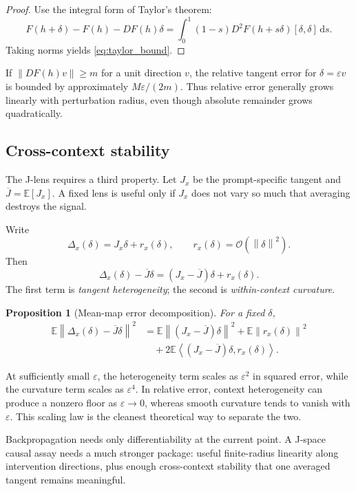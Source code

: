 \documentclass[11pt]{article}
\newcommand{\E}{\mathbb{E}}
\newcommand{\Jbar}{\overline{J}}
\newcommand{\Norm}[1]{\left\lVert #1 \right\rVert}
\newcommand{\ip}[2]{\left\langle #1,#2 \right\rangle}
\newcommand{\dd}{\,\mathrm{d}}
\newcommand{\cO}{\mathcal{O}}
\newcommand{\eps}{\varepsilon}
\newtheorem{proposition}{Proposition}
\theoremstyle{definition}
\theoremstyle{remark}
\begin{document}
\begin{proof}
Use the integral form of Taylor's theorem:
\[
F(h+\delta)-F(h)-DF(h)\delta
=\int_0^1(1-s)D^2F(h+s\delta)[\delta,\delta]\dd s.
\]
Taking norms yields \cref{eq:taylor_bound}.
\end{proof}

If $\Norm{DF(h)v}\ge m$ for a unit direction $v$, the relative tangent error for $\delta=\eps v$ is bounded by approximately $M\eps/(2m)$. Thus relative error generally grows linearly with perturbation radius, even though absolute remainder grows quadratically.

\subsection{Cross-context stability}
The J-lens requires a third property. Let $J_x$ be the prompt-specific tangent and $\Jbar=\E[J_x]$. A fixed lens is useful only if $J_x$ does not vary so much that averaging destroys the signal.

Write
\begin{equation}
  \Delta_x(\delta)=J_x\delta+r_x(\delta),
  \qquad r_x(\delta)=\cO(\Norm{\delta}^2).
  \label{eq:context_decomp}
\end{equation}
Then
\begin{equation}
  \Delta_x(\delta)-\Jbar\delta
  = (J_x-\Jbar)\delta+r_x(\delta).
  \label{eq:mean_error_decomp}
\end{equation}
The first term is \emph{tangent heterogeneity}; the second is \emph{within-context curvature}.

\begin{proposition}[Mean-map error decomposition]
For a fixed $\delta$,
\begin{align}
  \E\Norm{\Delta_x(\delta)-\Jbar\delta}^2
  &= \E\Norm{(J_x-\Jbar)\delta}^2
  + \E\Norm{r_x(\delta)}^2 \\
  &\quad +2\E\ip{(J_x-\Jbar)\delta}{r_x(\delta)}.
  \label{eq:mse_decomp}
\end{align}
\end{proposition}

At sufficiently small $\eps$, the heterogeneity term scales as $\eps^2$ in squared error, while the curvature term scales as $\eps^4$. In relative error, context heterogeneity can produce a nonzero floor as $\eps\to0$, whereas smooth curvature tends to vanish with $\eps$. This scaling law is the cleanest theoretical way to separate the two.

\begin{takeawaybox}
Backpropagation needs only differentiability at the current point. A J-space causal assay needs a much stronger package: useful finite-radius linearity along intervention directions, plus enough cross-context stability that one averaged tangent remains meaningful.
\end{takeawaybox}
\end{document}
